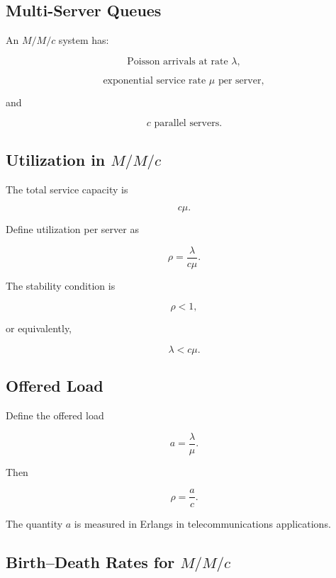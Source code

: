 \subsection{Multi-Server Queues}
\label{subsec:multi-server-queues}

An \(M/M/c\) system has:

\[
\boxed{
\text{Poisson arrivals at rate }\lambda,
}
\]

\[
\boxed{
\text{exponential service rate }\mu
\text{ per server},
}
\]

and

\[
\boxed{
c
\text{ parallel servers}.
}
\]

\subsection{Utilization in \(M/M/c\)}
\label{subsec:mmc-utilization}

The total service capacity is

\[
c\mu.
\]

Define utilization per server as

\[
\boxed{
\rho
=
\frac{
\lambda
}{
c\mu
}.
}
\]

The stability condition is

\[
\boxed{
\rho<1,
}
\]

or equivalently,

\[
\boxed{
\lambda<c\mu.
}
\]

\subsection{Offered Load}
\label{subsec:offered-load}

Define the offered load

\[
\boxed{
a
=
\frac{\lambda}{\mu}.
}
\]

Then

\[
\boxed{
\rho
=
\frac{a}{c}.
}
\]

The quantity \(a\) is measured in Erlangs in telecommunications
applications.

\subsection{Birth--Death Rates for \(M/M/c\)}
\label{subsec:mmc-birth-death}

